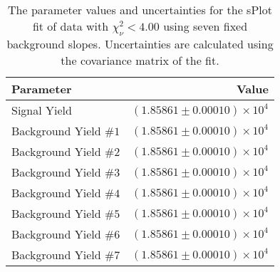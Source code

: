 
\begin{table}[ht]
    \begin{center}
        \begin{tabular}{lr}\toprule
            Parameter & Value \\\midrule
            Signal Yield & $(1.85861 \pm 0.00010) \times 10^{4}$ \\
            Background Yield $\#1$ & $(1.85861 \pm 0.00010) \times 10^{4}$ \\
            Background Yield $\#2$ & $(1.85861 \pm 0.00010) \times 10^{4}$ \\
            Background Yield $\#3$ & $(1.85861 \pm 0.00010) \times 10^{4}$ \\
            Background Yield $\#4$ & $(1.85861 \pm 0.00010) \times 10^{4}$ \\
            Background Yield $\#5$ & $(1.85861 \pm 0.00010) \times 10^{4}$ \\
            Background Yield $\#6$ & $(1.85861 \pm 0.00010) \times 10^{4}$ \\
            Background Yield $\#7$ & $(1.85861 \pm 0.00010) \times 10^{4}$ \\\bottomrule
        \end{tabular}
        \caption{The parameter values and uncertainties for the sPlot fit of data with $\chi^2_\nu < 4.00$ using seven fixed background slopes. Uncertainties are calculated using the covariance matrix of the fit.}\label{tab:splot-fit-results-chisqdof-4.00-fixed-7}
    \end{center}
\end{table}
